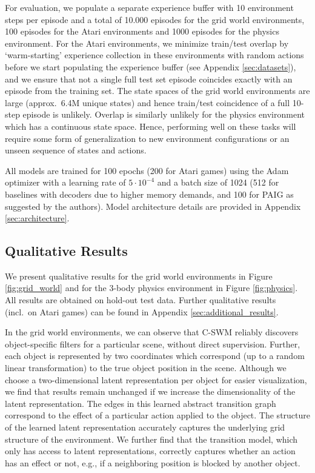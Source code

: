 \documentclass{article} %
\begin{document}
For evaluation, we populate a separate experience buffer with 10 environment steps per episode and a total of 10.000 episodes for the grid world environments, 100 episodes for the Atari environments and 1000 episodes for the physics environment. For the Atari environments, we minimize train/test overlap by `warm-starting' experience collection in these environments with random actions before we start populating the experience buffer (see Appendix \ref{sec:datasets}), and we ensure that not a single full test set episode coincides exactly with an episode from the training set. The state spaces of the grid world environments are large (approx.~6.4M unique states) and hence train/test coincidence of a full 10-step episode is unlikely. Overlap is similarly unlikely for the physics environment which has a continuous state space. Hence, performing well on these tasks will require some form of generalization to new environment configurations or an unseen sequence of states and actions.

All models are trained for 100 epochs (200 for Atari games) using the Adam \citep{kingma2014adam} optimizer with a learning rate of $5\cdot 10^{-4}$ and a batch size of 1024 (512 for baselines with decoders due to higher memory demands, and 100 for PAIG as suggested by the authors). Model architecture details are provided in Appendix \ref{sec:architecture}.

\subsection{Qualitative Results}

We present qualitative results for the grid world environments in Figure \ref{fig:grid_world} and for the 3-body physics environment in Figure \ref{fig:physics}. All results are obtained on hold-out test data. Further qualitative results (incl.~on Atari games) can be found in Appendix \ref{sec:additional_results}.

In the grid world environments, we can observe that C-SWM reliably discovers object-specific filters for a particular scene, without direct supervision. Further, each object is represented by two coordinates which correspond (up to a random linear transformation) to the true object position in the scene. Although we choose a two-dimensional latent representation per object for easier visualization, we find that results remain unchanged if we increase the dimensionality of the latent representation. The edges in this learned abstract transition graph correspond to the effect of a particular action applied to the object. The structure of the learned latent representation accurately captures the underlying grid structure of the environment. We further find that the transition model, which only has access to latent representations, correctly captures whether an action has an effect or not, e.g., if a neighboring position is blocked by another object.
\end{document}

